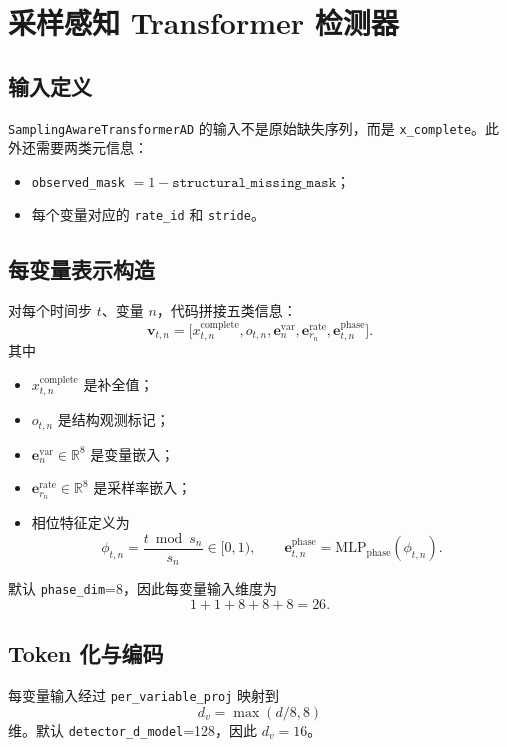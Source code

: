 \documentclass[UTF8,11pt,a4paper]{ctexart}
\begin{document}
\section{采样感知 Transformer 检测器}

\subsection{输入定义}

\texttt{SamplingAwareTransformerAD} 的输入不是原始缺失序列，而是
\texttt{x\_complete}。此外还需要两类元信息：
\begin{itemize}
  \item \texttt{observed\_mask} $= 1-\texttt{structural\_missing\_mask}$；
  \item 每个变量对应的 \texttt{rate\_id} 和 \texttt{stride}。
\end{itemize}

\subsection{每变量表示构造}

对每个时间步 $t$、变量 $n$，代码拼接五类信息：
\[
\bm{v}_{t,n}
=
\big[
x^{\mathrm{complete}}_{t,n},
o_{t,n},
\bm{e}^{\mathrm{var}}_n,
\bm{e}^{\mathrm{rate}}_{r_n},
\bm{e}^{\mathrm{phase}}_{t,n}
\big].
\]
其中
\begin{itemize}
  \item $x^{\mathrm{complete}}_{t,n}$ 是补全值；
  \item $o_{t,n}$ 是结构观测标记；
  \item $\bm{e}^{\mathrm{var}}_n\in\mathbb{R}^{8}$ 是变量嵌入；
  \item $\bm{e}^{\mathrm{rate}}_{r_n}\in\mathbb{R}^{8}$ 是采样率嵌入；
  \item 相位特征定义为
  \[
  \phi_{t,n}=\frac{t\bmod s_n}{s_n}\in[0,1),
  \qquad
  \bm{e}^{\mathrm{phase}}_{t,n}
  =
  \mathrm{MLP}_{\mathrm{phase}}(\phi_{t,n}).
  \]
\end{itemize}

默认 \texttt{phase\_dim}=8，因此每变量输入维度为
\[
1+1+8+8+8=26.
\]

\subsection{Token 化与编码}

每变量输入经过 \texttt{per\_variable\_proj} 映射到
\[
d_v=\max(d/8,8)
\]
维。默认 \texttt{detector\_d\_model}=128，因此 $d_v=16$。
\end{document}
